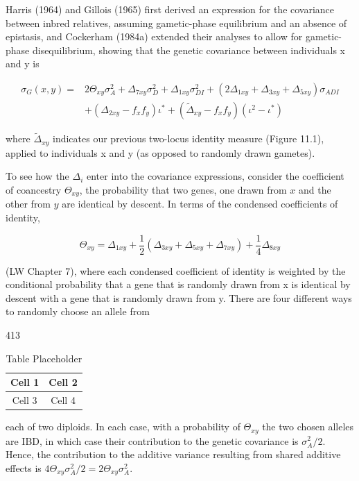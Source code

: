 \documentclass{article}
\begin{document}
Harris (1964) and Gillois (1965) first derived an expression for the covariance between inbred relatives, assuming gametic-phase equilibrium and an absence of epistasis, and Cockerham (1984a) extended their analyses to allow for gametic-phase disequilibrium, showing that the genetic covariance between individuals x and y is

\begin{equation}
\begin{aligned}\sigma_{G}(x,y)=&2\Theta_{xy}\sigma_{A}^{2}+\Delta_{7xy}\sigma_{D}^{2}+\Delta_{1xy}\sigma_{DI}^{2}+(2\Delta_{1xy}+\Delta_{3xy}+\Delta_{5xy})\sigma_{ADI}\\&+(\Delta_{2xy}-f_{x} f_{y})\iota^{*}+(\widetilde{\Delta}_{xy}-f_{x} f_{y})(\iota^{2}-\iota^{*})\end{aligned}
\tag{11.13}
\label{eq:11_13}
\end{equation}

where  $ \tilde{\Delta}_{xy} $ indicates our previous two-locus identity measure (Figure 11.1), applied to individuals x and y (as opposed to randomly drawn gametes).

To see how the  $ \Delta_i $ enter into the covariance expressions, consider the coefficient of coancestry  $ \Theta_{xy} $, the probability that two genes, one drawn from  $ x $ and the other from  $ y $ are identical by descent. In terms of the condensed coefficients of identity,

\begin{equation}
\Theta_{xy}=\Delta_{1xy}+\frac{1}{2}(\Delta_{3xy}+\Delta_{5xy}+\Delta_{7xy})+\frac{1}{4}\Delta_{8xy}
\tag{11.14}
\label{eq:11_14}
\end{equation}

(LW Chapter 7), where each condensed coefficient of identity is weighted by the conditional probability that a gene that is randomly drawn from x is identical by descent with a gene that is randomly drawn from y. There are four different ways to randomly choose an allele from

413

\begin{table}[h]
\centering
\begin{tabular}{|c|c|}
\hline
Cell 1 & Cell 2 \\
\hline
Cell 3 & Cell 4 \\
\hline
\end{tabular}
\caption{Table Placeholder}
\end{table}

each of two diploids. In each case, with a probability of  $ \Theta_{xy} $ the two chosen alleles are IBD, in which case their contribution to the genetic covariance is  $ \sigma_A^2/2 $. Hence, the contribution to the additive variance resulting from shared additive effects is  $ 4\Theta_{xy}\sigma_A^2/2 = 2\Theta_{xy}\sigma_A^2 $.
\end{document}

